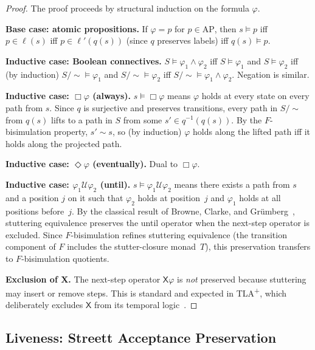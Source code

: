\documentclass[11pt]{article}
\newcommand{\AP}{\ensuremath{\mathrm{AP}}}
\newcommand{\TLAplus}{TLA\textsuperscript{+}}
\begin{document}
\begin{proof}
The proof proceeds by structural induction on the formula $\varphi$.

\textbf{Base case: atomic propositions.}
If $\varphi = p$ for $p \in \AP$, then $s \models p$ iff
$p \in \ell(s)$ iff $p \in \ell'(q(s))$ (since $q$ preserves labels)
iff $q(s) \models p$.

\textbf{Inductive case: Boolean connectives.}
$S \models \varphi_1 \wedge \varphi_2$ iff $S \models \varphi_1$ and
$S \models \varphi_2$ iff (by induction) $S/{\sim} \models \varphi_1$ and
$S/{\sim} \models \varphi_2$ iff $S/{\sim} \models \varphi_1 \wedge \varphi_2$.
Negation is similar.

\textbf{Inductive case: $\Box\varphi$ (always).}
$s \models \Box\varphi$ means $\varphi$ holds at every state on every path
from $s$.
Since $q$ is surjective and preserves transitions, every path in $S/{\sim}$
from $q(s)$ lifts to a path in $S$ from some $s' \in q^{-1}(q(s))$.
By the $F$-bisimulation property, $s' \sim s$, so (by induction) $\varphi$
holds along the lifted path iff it holds along the projected path.

\textbf{Inductive case: $\Diamond\varphi$ (eventually).}
Dual to $\Box\varphi$.

\textbf{Inductive case: $\varphi_1 \mathbin{\mathcal{U}} \varphi_2$ (until).}
$s \models \varphi_1 \mathbin{\mathcal{U}} \varphi_2$ means there exists a
path from $s$ and a position $j$ on it such that $\varphi_2$ holds at
position~$j$ and $\varphi_1$ holds at all positions before~$j$.
By the classical result of Browne, Clarke, and Gr\"umberg~\cite{BrowneCG88},
stuttering equivalence preserves the until operator when the next-step
operator is excluded.
Since $F$-bisimulation refines stuttering equivalence (the transition
component of $F$ includes the stutter-closure monad~$T$), this
preservation transfers to $F$-bisimulation quotients.

\textbf{Exclusion of X.}
The next-step operator $\mathsf{X}\varphi$ is \emph{not} preserved because
stuttering may insert or remove steps.
This is standard and expected in \TLAplus{}, which deliberately excludes
$\mathsf{X}$ from its temporal logic~\cite{Lamport94}.
\end{proof}

\subsection{Liveness: Streett Acceptance Preservation}
\end{document}
